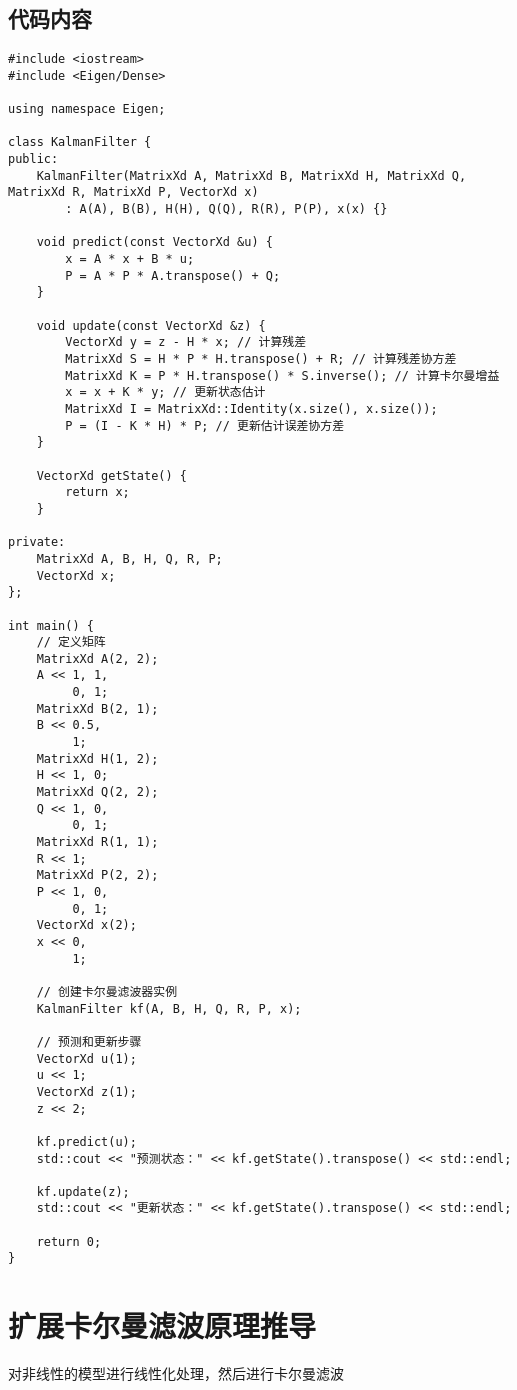 \documentclass[12pt, a4paper, oneside]{ctexbook}
\begin{document}
\section{代码内容}
\lstset{language=C++,breaklines=true}
\begin{lstlisting}[caption={使用Eigen库实现}, label={lst:train-precision}]
#include <iostream>
#include <Eigen/Dense>

using namespace Eigen;

class KalmanFilter {
public:
    KalmanFilter(MatrixXd A, MatrixXd B, MatrixXd H, MatrixXd Q, MatrixXd R, MatrixXd P, VectorXd x)
        : A(A), B(B), H(H), Q(Q), R(R), P(P), x(x) {}

    void predict(const VectorXd &u) {
        x = A * x + B * u;
        P = A * P * A.transpose() + Q;
    }

    void update(const VectorXd &z) {
        VectorXd y = z - H * x; // 计算残差
        MatrixXd S = H * P * H.transpose() + R; // 计算残差协方差
        MatrixXd K = P * H.transpose() * S.inverse(); // 计算卡尔曼增益
        x = x + K * y; // 更新状态估计
        MatrixXd I = MatrixXd::Identity(x.size(), x.size());
        P = (I - K * H) * P; // 更新估计误差协方差
    }

    VectorXd getState() {
        return x;
    }

private:
    MatrixXd A, B, H, Q, R, P;
    VectorXd x;
};

int main() {
    // 定义矩阵
    MatrixXd A(2, 2);
    A << 1, 1,
         0, 1;
    MatrixXd B(2, 1);
    B << 0.5,
         1;
    MatrixXd H(1, 2);
    H << 1, 0;
    MatrixXd Q(2, 2);
    Q << 1, 0,
         0, 1;
    MatrixXd R(1, 1);
    R << 1;
    MatrixXd P(2, 2);
    P << 1, 0,
         0, 1;
    VectorXd x(2);
    x << 0,
         1;

    // 创建卡尔曼滤波器实例
    KalmanFilter kf(A, B, H, Q, R, P, x);

    // 预测和更新步骤
    VectorXd u(1);
    u << 1;
    VectorXd z(1);
    z << 2;

    kf.predict(u);
    std::cout << "预测状态：" << kf.getState().transpose() << std::endl;

    kf.update(z);
    std::cout << "更新状态：" << kf.getState().transpose() << std::endl;

    return 0;
}
\end{lstlisting}
\chapter{扩展卡尔曼滤波原理推导}
对非线性的模型进行线性化处理，然后进行卡尔曼滤波
\end{document}
